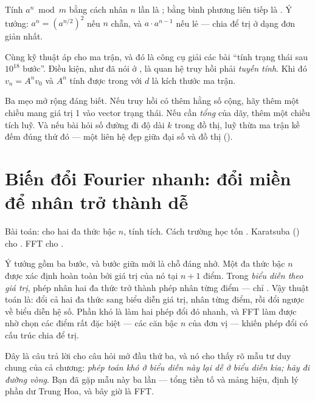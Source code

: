 \documentclass[../../algorithm.tex]{subfiles}
\begin{document}
Tính \(a^n \bmod m\) bằng cách nhân \(n\) lần là ; bằng bình phương liên tiếp là . Ý tưởng: \(a^n = (a^{n/2})^2\) nếu \(n\) chẵn, và \(a\cdot a^{n-1}\) nếu lẻ --- chia để trị ở dạng đơn giản nhất.

Cùng kỹ thuật áp cho ma trận, và đó là công cụ giải các bài ``tính trạng thái sau \(10^{18}\) bước''. Điều kiện, như đã nói ở , là quan hệ truy hồi phải \emph{tuyến tính}. Khi đó \(v_n = A^n v_0\) và \(A^n\) tính được trong  với \(d\) là kích thước ma trận.

Ba mẹo mở rộng đáng biết. Nếu truy hồi có thêm hằng số cộng, hãy thêm một chiều mang giá trị 1 vào vector trạng thái. Nếu cần \emph{tổng} của dãy, thêm một chiều tích luỹ. Và nếu bài hỏi số đường đi độ dài \(k\) trong đồ thị, luỹ thừa ma trận kề đếm đúng thứ đó --- một liên hệ đẹp giữa đại số và đồ thị ().

\section{Biến đổi Fourier nhanh: đổi miền để nhân trở thành dễ}

Bài toán: cho hai đa thức bậc \(n\), tính tích. Cách trường học tốn . Karatsuba () cho . FFT cho .

Ý tưởng gồm ba bước, và bước giữa mới là chỗ đáng nhớ. Một đa thức bậc \(n\) được xác định hoàn toàn bởi giá trị của nó tại \(n+1\) điểm. Trong \emph{biểu diễn theo giá trị}, phép nhân hai đa thức trở thành phép nhân từng điểm --- chỉ . Vậy thuật toán là: đổi cả hai đa thức sang biểu diễn giá trị, nhân từng điểm, rồi đổi ngược về biểu diễn hệ số. Phần khó là làm hai phép đổi đó nhanh, và FFT làm được nhờ chọn các điểm rất đặc biệt --- các căn bậc \(n\) của đơn vị --- khiến phép đổi có cấu trúc chia để trị.

Đây là câu trả lời cho câu hỏi mở đầu thứ ba, và nó cho thấy rõ mẫu tư duy chung của cả chương: \emph{phép toán khó ở biểu diễn này lại dễ ở biểu diễn kia; hãy đi đường vòng}. Bạn đã gặp mẫu này ba lần --- tổng tiền tố và mảng hiệu, định lý phần dư Trung Hoa, và bây giờ là FFT.
\end{document}
